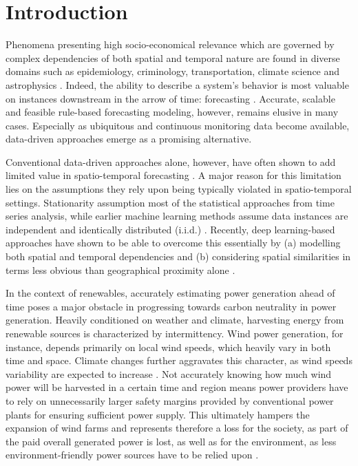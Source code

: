 \chapter{Introduction}
Phenomena presenting high socio-economical relevance which are governed by complex dependencies of both spatial and temporal nature are found in diverse domains such as epidemiology, criminology, transportation, climate science and astrophysics \cite{atluri2018datamining}.
Indeed, the ability to describe a system's behavior is most valuable on instances downstream in the arrow of time: forecasting \cite{armstrong2002principles}.
Accurate, scalable and feasible rule-based forecasting modeling, however, remains elusive in many cases.
Especially as ubiquitous and continuous monitoring data become available, data-driven approaches emerge as a promising alternative.

Conventional data-driven approaches alone, however, have often shown to add limited value in spatio-temporal forecasting \cite{makridakis2018waysforward}.
A major reason for this limitation lies on the assumptions they rely upon being typically violated in spatio-temporal settings.
Stationarity assumption most of the statistical approaches from time series analysis, while earlier machine learning methods assume data instances are independent and identically distributed (i.i.d.) \cite{atluri2018datamining}.
Recently, deep learning-based approaches have shown to be able to overcome this essentially by (a) modelling both spatial and temporal dependencies and (b) considering spatial similarities in terms less obvious than geographical proximity alone \cite{li2018dcrnn, liu2019st-mgcn, wu2019graphwavenet}.

In the context of renewables, accurately estimating power generation ahead of time poses a major obstacle in progressing towards carbon neutrality in power generation.
Heavily conditioned on weather and climate, harvesting energy from renewable sources is characterized by intermittency.
Wind power generation, for instance, depends primarily on local wind speeds, which heavily vary in both time and space.
Climate changes further aggravates this character, as wind speeds variability are expected to increase \cite{moemken2018windspeedchanges}.
Not accurately knowing how much wind power will be harvested in a certain time and region means power providers have to rely on unnecessarily larger safety margins provided by conventional power plants for ensuring sufficient power supply.
This ultimately hampers the expansion of wind farms and represents therefore a loss for the society, as part of the paid overall generated power is lost, as well as for the environment, as less environment-friendly power sources have to be relied upon \cite{delarue2015intermittency}.

